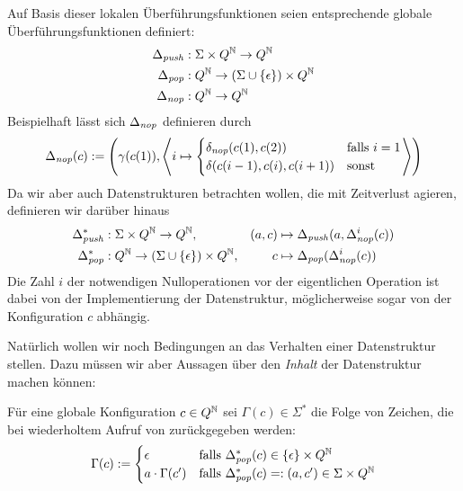 \documentclass{article}
\begin{document}
Auf Basis dieser lokalen Überführungsfunktionen seien entsprechende globale Überführungsfunktionen definiert:
\begin{align*}
    \Delta_{\mathit{push}} &: \Sigma \times Q^{\mathbb{N}} \rightarrow Q^{\mathbb{N}} \\
    \Delta_{\mathit{pop}} &: Q^{\mathbb{N}} \rightarrow (\Sigma \cup \{\epsilon\}) \times Q^{\mathbb{N}} \\
    \Delta_{\mathit{nop}} &: Q^{\mathbb{N}} \rightarrow Q^{\mathbb{N}}
\end{align*}
Beispielhaft lässt sich $\Delta_\mathit{nop}$ definieren durch
\[ \Delta_\mathit{nop}(c) := \left(\gamma(c(1)), \left< i \mapsto \begin{cases}
        \delta_\mathit{nop}(c(1), c(2)) &\text{falls } i = 1 \\
        \delta(c(i-1), c(i), c(i+1)) &\text{sonst }
\end{cases} \right> \right) \]
Da wir aber auch Datenstrukturen betrachten wollen, die mit Zeitverlust agieren, definieren wir darüber hinaus
\begin{align*}
    \Delta^*_{\mathit{push}} &: \Sigma \times Q^{\mathbb{N}} \rightarrow Q^{\mathbb{N}},& (a,c) &\mapsto \Delta_{\mathit{push}}(a,\Delta^i_{\mathit{nop}}(c)) \\
    \Delta^*_{\mathit{pop}} &: Q^{\mathbb{N}} \rightarrow (\Sigma \cup \{\epsilon\}) \times Q^{\mathbb{N}},& c &\mapsto \Delta_{\mathit{pop}}(\Delta^i_{\mathit{nop}}(c))
\end{align*}
Die Zahl $i$ der notwendigen Nulloperationen vor der eigentlichen Operation ist dabei von der Implementierung der Datenstruktur, möglicherweise sogar von der Konfiguration $c$ abhängig.

Natürlich wollen wir noch Bedingungen an das Verhalten einer Datenstruktur stellen. Dazu müssen wir aber Aussagen über den \emph{Inhalt} der Datenstruktur machen können:
\begin{definition}
    Für eine globale Konfiguration $c \in Q^{\mathbb{N}}$ sei $\Gamma(c) \in \Sigma^*$ die Folge von Zeichen, die bei wiederholtem Aufruf von \pop zurückgegeben werden:
    \[ \Gamma(c) :=
        \begin{cases}
            \epsilon &\text{falls } \Delta^*_{\mathit{pop}}(c) \in \{\epsilon\} \times Q^{\mathbb{N}} \\
            a \cdot \Gamma(c') &\text{falls }\Delta^*_{\mathit{pop}}(c)=:(a,c') \in \Sigma \times Q^{\mathbb{N}}
    \end{cases} \]
\end{definition}
\end{document}
